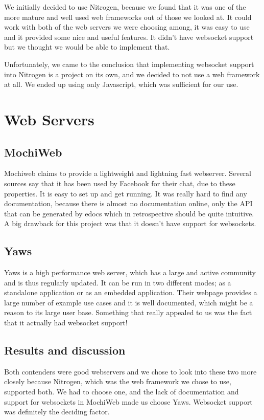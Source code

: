 \documentclass[11pt,a4paper]{report}
\begin{document}
We initially decided to use Nitrogen, because we found that it was one of the
more mature and well used web frameworks out of those we looked at. It could
work with both of the web servers we were choosing among, it was easy to use and
it provided some nice and useful features. It didn't have websocket support but
we thought we would be able to implement that.

Unfortunately, we came to the conclusion that implementing websocket support
into Nitrogen is a project on its own, and we decided to not use a web
framework at all. We ended up using only Javascript, which was sufficient for
our use.

\section{Web Servers}
\subsection{MochiWeb}
Mochiweb\cite{mochiweb} claims to provide a lightweight and lightning fast webserver.
Several sources say that it has been used by Facebook for their chat\cite{fb_chat}\cite{fb_pres},
due to these properties. It is easy to set up and get running. It was really
hard to find any documentation, because there is almost no documentation online,
only the API that can be generated by edocs which in retrospective should be
quite intuitive. A big drawback for this project was that it doesn't have
support for websockets.

\subsection{Yaws}
Yaws\cite{yaws} is a high performance web server, which has a large and active
community and is thus regularly updated. It can be run in two different modes;
as a standalone application or as an embedded application. Their webpage
provides a large number of example use cases and it is well documented, which
might be a reason to its large user base. Something that really appealed to us
was the fact that it actually had websocket support!

\subsection{Results and discussion}
Both contenders were good webservers and we chose to look into these two more
closely because Nitrogen, which was the web framework we chose to use,
supported both. We had to choose one, and the lack of documentation and support
for websockets in MochiWeb made us choose Yaws. Websocket support was definitely
the deciding factor.\\
\end{document}
